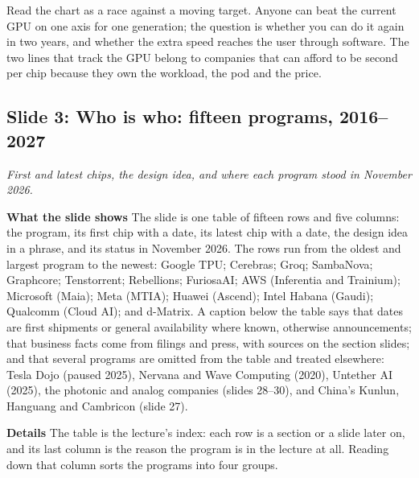 \documentclass[11pt,letterpaper]{article}
\newcommand{\slide}[3]{%
  \subsection[Slide #1: #2]{Slide #1: #2}%
  {\color{muted}\itshape #3\par}\medskip}
\newcommand{\para}[1]{\medskip\noindent\textbf{#1}\quad}
\newenvironment{intuition}{\begin{tcolorbox}[intuitionbox]}{\end{tcolorbox}}
\begin{document}
\begin{intuition}
Read the chart as a race against a moving target. Anyone can beat the current GPU on one axis for one generation; the question is whether you can do it again in two years, and whether the extra speed reaches the user through software. The two lines that track the GPU belong to companies that can afford to be second per chip because they own the workload, the pod and the price.
\end{intuition}

\slide{3}{Who is who: fifteen programs, 2016--2027}{First and latest chips, the design idea, and where each program stood in November 2026.}

\para{What the slide shows} The slide is one table of fifteen rows and five columns: the program, its first chip with a date, its latest chip with a date, the design idea in a phrase, and its status in November 2026. The rows run from the oldest and largest program to the newest: Google TPU; Cerebras; Groq; SambaNova; Graphcore; Tenstorrent; Rebellions; FuriosaAI; AWS (Inferentia and Trainium); Microsoft (Maia); Meta (MTIA); Huawei (Ascend); Intel Habana (Gaudi); Qualcomm (Cloud AI); and d-Matrix. A caption below the table says that dates are first shipments or general availability where known, otherwise announcements; that business facts come from filings and press, with sources on the section slides; and that several programs are omitted from the table and treated elsewhere: Tesla Dojo (paused 2025), Nervana and Wave Computing (2020), Untether AI (2025), the photonic and analog companies (slides 28--30), and China's Kunlun, Hanguang and Cambricon (slide 27).

\para{Details} The table is the lecture's index: each row is a section or a slide later on, and its last column is the reason the program is in the lecture at all. Reading down that column sorts the programs into four groups.
\end{document}
